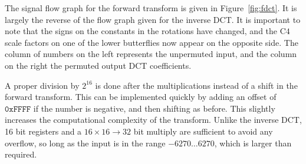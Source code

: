 \documentclass[9pt,letterpaper]{book}
\newcommand{\locvar}[1]{\ensuremath{\mathrm{#1}}}
\newcommand{\hex}[1]{\ensuremath{\mathtt{0x#1}}}
\numberwithin{equation}{chapter}
\numberwithin{figure}{chapter}
\numberwithin{table}{chapter}
\begin{document}
The signal flow graph for the forward transform is given in
 Figure~\ref{fig:fdct}.
It is largely the reverse of the flow graph given for the inverse DCT.
It is important to note that the signs on the constants in the rotations have
 changed, and the \locvar{C4} scale factors on one of the lower butterflies now
 appear on the opposite side.
The column of numbers on the left represents the unpermuted input, and the
 column on the right the permuted output DCT coefficients.

A proper division by $2^{16}$ is done after the multiplications instead of a
 shift in the forward transform.
This can be implemented quickly by adding an offset of $\hex{FFFF}$ if the
 number is negative, and then shifting as before.
This slightly increases the computational complexity of the transform.
Unlike the inverse DCT, 16 bit registers and a $16\times16\rightarrow32$ bit
 multiply are sufficient to avoid any overflow, so long as the input is in the
 range $-6270\ldots 6270$, which is larger than required.
\end{document}
